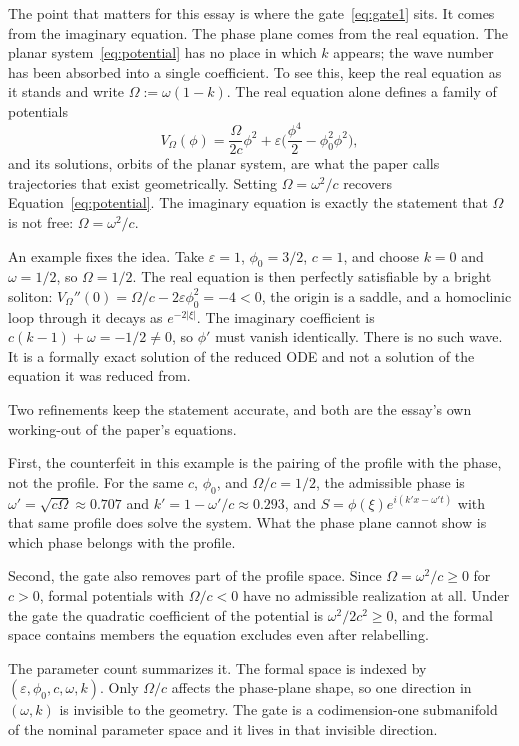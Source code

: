 \documentclass[11pt]{article}
\theoremstyle{definition}
\theoremstyle{remark}
\begin{document}
The point that matters for this essay is where the gate~\eqref{eq:gate1} sits. It comes from the imaginary equation. The phase plane comes from the real equation. The planar system~\eqref{eq:potential} has no place in which $k$ appears; the wave number has been absorbed into a single coefficient. To see this, keep the real equation as it stands and write $\Omega:=\omega(1-k)$. The real equation alone defines a family of potentials
\begin{equation}
  V_\Omega(\phi)=\frac{\Omega}{2c}\phi^2+\varepsilon\Big(\frac{\phi^4}{2}-\phi_0^2\phi^2\Big),
  \label{eq:formal-potential}
\end{equation}
and its solutions, orbits of the planar system, are what the paper calls trajectories that exist geometrically. Setting $\Omega=\omega^2/c$ recovers Equation~\eqref{eq:potential}. The imaginary equation is exactly the statement that $\Omega$ is not free: $\Omega=\omega^2/c$.

An example fixes the idea. Take $\varepsilon=1$, $\phi_0=3/2$, $c=1$, and choose $k=0$ and $\omega=1/2$, so $\Omega=1/2$. The real equation is then perfectly satisfiable by a bright soliton: $V_\Omega''(0)=\Omega/c-2\varepsilon\phi_0^2=-4<0$, the origin is a saddle, and a homoclinic loop through it decays as $e^{-2|\xi|}$. The imaginary coefficient is $c(k-1)+\omega=-1/2\neq0$, so $\phi'$ must vanish identically. There is no such wave. It is a formally exact solution of the reduced ODE and not a solution of the equation it was reduced from.

Two refinements keep the statement accurate, and both are the essay's own working-out of the paper's equations.

First, the counterfeit in this example is the pairing of the profile with the phase, not the profile. For the same $c$, $\phi_0$, and $\Omega/c=1/2$, the admissible phase is $\omega'=\sqrt{c\Omega}\approx0.707$ and $k'=1-\omega'/c\approx0.293$, and $S=\phi(\xi)e^{i(k'x-\omega' t)}$ with that same profile does solve the system. What the phase plane cannot show is which phase belongs with the profile.

Second, the gate also removes part of the profile space. Since $\Omega=\omega^2/c\ge0$ for $c>0$, formal potentials with $\Omega/c<0$ have no admissible realization at all. Under the gate the quadratic coefficient of the potential is $\omega^2/2c^2\ge0$, and the formal space contains members the equation excludes even after relabelling.

The parameter count summarizes it. The formal space is indexed by $(\varepsilon,\phi_0,c,\omega,k)$. Only $\Omega/c$ affects the phase-plane shape, so one direction in $(\omega,k)$ is invisible to the geometry. The gate is a codimension-one submanifold of the nominal parameter space and it lives in that invisible direction.
\end{document}
